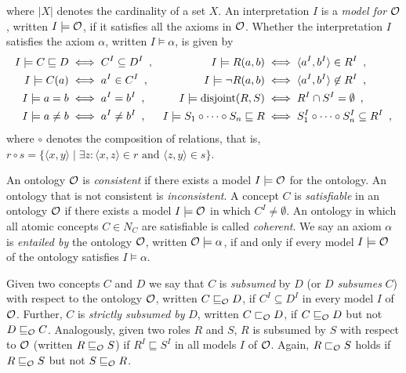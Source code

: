 where $|X|$ denotes the cardinality of a set $X$.
An interpretation $I$ is a \emph{model for} $\mathcal{O}$, written $I \models \mathcal{O}$, if it satisfies all the axioms in $\mathcal{O}$. Whether the interpretation $I$ satisfies the axiom $\alpha$, written $I \models \alpha$, is given by
\begin{align*}
  I \models C \sqsubseteq D &\iff C^I \subseteq D^I \enspace, &
  I \models R(a, b) &\iff \langle a^I, b^I \rangle \in R^I \enspace,\\
  I \models C(a) &\iff a^I \in C^I \enspace, &
  I \models \lnot R(a, b) &\iff \langle a^I, b^I \rangle \not\in R^I \enspace, \\
  I \models a = b &\iff a^I = b^I \enspace, &
  I \models \operatorname{disjoint}(R, S) &\iff R^I \cap S^I = \emptyset \enspace, \\
  I \models a \not= b &\iff a^I \not= b^I \enspace, &
  I \models S_1 \circ \cdots \circ S_n \sqsubseteq R &\iff S_1^I \circ \cdots \circ S_n^I \subseteq R^I \enspace,
\end{align*}
where $\circ$ denotes the composition of relations, that is, $r \circ s = \{ \langle x, y \rangle \mid \exists z : \langle x, z \rangle \in r \text{ and } \langle z, y \rangle \in s \}$.

An ontology $\mathcal{O}$ is \emph{consistent} if there exists a model $I \models \mathcal{O}$ for the ontology. An ontology that is not consistent is \emph{inconsistent}. A concept $C$ is \emph{satisfiable} in an ontology $\mathcal{O}$ if there exists a model $I \models \mathcal{O}$ in which $C^I \not= \emptyset$. An ontology in which all atomic concepts $C \in N_C$ are satisfiable is called \emph{coherent}. We say an axiom $\alpha$ is \emph{entailed by} the ontology $\mathcal{O}$, written $\mathcal{O} \models \alpha$, if and only if every model $I \models \mathcal{O}$ of the ontology satisfies $I \models \alpha$. 

Given two concepts $C$ and $D$ we say that $C$ is \emph{subsumed} by $D$ (or $D$ \emph{subsumes} $C$) with respect to the ontology $\mathcal{O}$, written $C \sqsubseteq_\mathcal{O} D$, if $C^I \subseteq D^I$ in every model $I$ of $\mathcal{O}$. Further, $C$ is \emph{strictly subsumed by} $D$, written $C \sqsubset_\mathcal{O} D$, if $C \sqsubseteq_\mathcal{O} D$ but not $D \sqsubseteq_\mathcal{O} C$. Analogously, given two roles $R$ and $S$, $R$ is subsumed by $S$ with respect to $\mathcal{O}$ (written $R \sqsubseteq_\mathcal{O} S$) if $R^I \sqsubseteq S^I$ in all models $I$ of $\mathcal{O}$. Again, $R \sqsubset_\mathcal{O} S$ holds if $R \sqsubseteq_\mathcal{O} S$ but not $S \sqsubseteq_\mathcal{O} R$.

